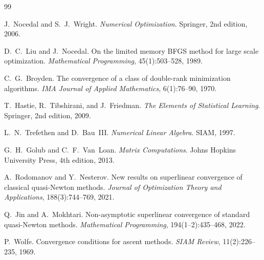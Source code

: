 \documentclass[11pt,a4paper]{article}
\begin{document}

\begin{thebibliography}{99}

J.~Nocedal and S.~J.~Wright.
\newblock \emph{Numerical Optimization}.
\newblock Springer, 2nd edition, 2006.

D.~C.~Liu and J.~Nocedal.
\newblock On the limited memory {BFGS} method for large scale optimization.
\newblock \emph{Mathematical Programming}, 45(1):503--528, 1989.

C.~G.~Broyden.
\newblock The convergence of a class of double-rank minimization algorithms.
\newblock \emph{IMA Journal of Applied Mathematics}, 6(1):76--90, 1970.

T.~Hastie, R.~Tibshirani, and J.~Friedman.
\newblock \emph{The Elements of Statistical Learning}.
\newblock Springer, 2nd edition, 2009.

L.~N.~Trefethen and D.~Bau~III.
\newblock \emph{Numerical Linear Algebra}.
\newblock SIAM, 1997.

G.~H.~Golub and C.~F.~Van~Loan.
\newblock \emph{Matrix Computations}.
\newblock Johns Hopkins University Press, 4th edition, 2013.

A.~Rodomanov and Y.~Nesterov.
\newblock New results on superlinear convergence of classical quasi-{N}ewton methods.
\newblock \emph{Journal of Optimization Theory and Applications}, 188(3):744--769, 2021.

Q.~Jin and A.~Mokhtari.
\newblock Non-asymptotic superlinear convergence of standard quasi-{N}ewton methods.
\newblock \emph{Mathematical Programming}, 194(1--2):435--468, 2022.

P.~Wolfe.
\newblock Convergence conditions for ascent methods.
\newblock \emph{SIAM Review}, 11(2):226--235, 1969.

\end{thebibliography}
\end{document}

